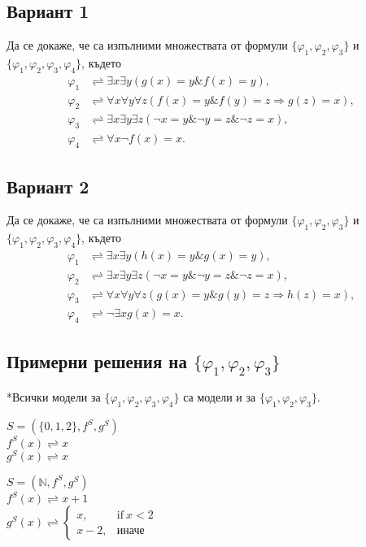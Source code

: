 \documentclass{article}
\renewcommand{\phi}{\varphi}
\theoremstyle{definition}
\renewcommand{\land}{\&}
\renewcommand{\phi}{\varphi}
\begin{document}
\subsection{Вариант 1}
  Да се докаже, че са изпълними множествата от формули
  $\{\phi_1,\phi_2,\phi_3\}$ и $\{\phi_1,\phi_2,\phi_3,\phi_4\}$, където
  \begin{align*}
  \phi_1 &\rightleftharpoons \exists x \exists y (g(x) = y \land
  f(x) = y),
  \\
  \phi_2 &\rightleftharpoons \forall x \forall y \forall z
  (f(x) = y \land f(y) = z \Longrightarrow g(z) = x),
  \\
  \phi_3 &\rightleftharpoons \exists x \exists y \exists z (\neg
  x = y \land \neg y = z \land \neg z = x),
  \\
  \phi_4 &\rightleftharpoons \forall x\neg f(x)=x.
  \end{align*}

\subsection{Вариант 2}
  Да се докаже, че са изпълними множествата от формули
  $\{\phi_1,\phi_2,\phi_3\}$ и $\{\phi_1,\phi_2,\phi_3,\phi_4\}$, където
  \begin{align*}
  \phi_1 &\rightleftharpoons \exists x \exists y (h(x) = y \land
  g(x) = y),
  \\
  \phi_2 &\rightleftharpoons \exists x \exists y \exists z (\neg
  x = y \land \neg y = z \land \neg z = x),
  \\
  \phi_3 &\rightleftharpoons \forall x \forall y \forall z
  (g(x) = y \land g(y) = z \Longrightarrow h(z) = x),
  \\
  \phi_4 &\rightleftharpoons \neg\exists x g(x)=x.
  \end{align*}
\subsection{Примерни решения на $\{\phi_1,\phi_2,\phi_3\}$ }
*Всички модели за $\{\phi_1,\phi_2,\phi_3,\phi_4\}$ са модели и за $\{\phi_1,\phi_2,\phi_3\}$.\\
\begin{addmargin}[1em]{2em}
\begin{center}
$ S = ( \{0, 1, 2\}, f^S, g^S)$ \\
$f^S(x)\rightleftharpoons x$\\
$g^S(x)\rightleftharpoons x$
\end{center}
\end{addmargin}
\vskip 0.2in
\begin{addmargin}[1em]{2em}
\begin{center}
  $ S = ( \mathbb{{N}}, f^S, g^S)$ \\
  $f^S(x)\rightleftharpoons x+1$\\
  $g^S(x)\rightleftharpoons 
  \begin{cases}
    x, & \text{if}\ x<2 \\
    x-2, & \text{иначе}
  \end{cases}$
\end{center}
\end{addmargin}
\end{document}
